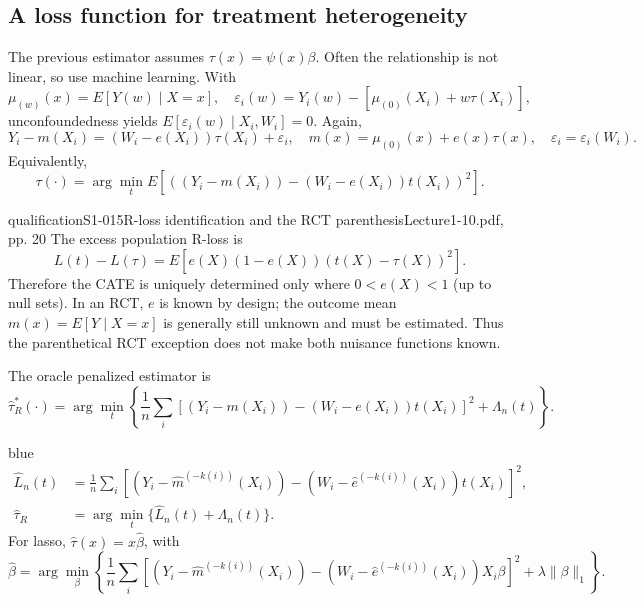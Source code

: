 \subsection{A loss function for treatment heterogeneity}
The previous estimator assumes $\tau(x)=\psi(x)\beta$. Often the relationship is not linear, so use machine learning. With
\[
\mu_{(w)}(x)=E[Y(w)\mid X=x],\quad
\varepsilon_i(w)=Y_i(w)-[\mu_{(0)}(X_i)+w\tau(X_i)],
\]
unconfoundedness yields $E[\varepsilon_i(w)\mid X_i,W_i]=0$.  Again,
\[
Y_i-m(X_i)=(W_i-e(X_i))\tau(X_i)+\varepsilon_i,
\quad m(x)=\mu_{(0)}(x)+e(x)\tau(x),\quad \varepsilon_i=\varepsilon_i(W_i).
\]
Equivalently,
\[
\tau(\cdot)=\arg\min_{t}E[((Y_i-m(X_i))-(W_i-e(X_i))t(X_i))^2].
\]
\begin{reviewnote}{qualification}{S1-015}{R-loss identification and the RCT parenthesis}{Lecture1-10.pdf, pp. 20}
The excess population R-loss is
\[
L(t)-L(\tau)=E[e(X)(1-e(X))(t(X)-\tau(X))^2].
\]
Therefore the CATE is uniquely determined only where $0<e(X)<1$ (up to null sets). In an RCT, $e$ is known by design; the outcome mean $m(x)=E[Y\mid X=x]$ is generally still unknown and must be estimated. Thus the parenthetical RCT exception does not make both nuisance functions known.
\end{reviewnote}
 The oracle penalized estimator is
\[
\widehat\tau_R^*(\cdot)=\arg\min_t\left\{
\frac1n\sum_i[(Y_i-m(X_i))-(W_i-e(X_i))t(X_i)]^2+\Lambda_n(t)\right\}.
\]
 
\begin{inkblock}{blue}
\begin{align*}
\widehat L_n(t)&=\frac1n\sum_i
[(Y_i-\widehat m^{(-k(i))}(X_i))-(W_i-\widehat e^{(-k(i))}(X_i))t(X_i)]^2,\\
\widehat\tau_R&=\arg\min_t\{\widehat L_n(t)+\Lambda_n(t)\}.
\end{align*}
For lasso, $\widehat\tau(x)=x\widehat\beta$, with
\[
\widehat\beta=\arg\min_\beta\left\{\frac1n\sum_i
[(Y_i-\widehat m^{(-k(i))}(X_i))-(W_i-\widehat e^{(-k(i))}(X_i))X_i\beta]^2
+\lambda\|\beta\|_1\right\}.
\]
\end{inkblock}

